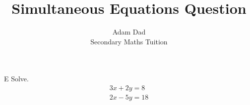 \documentclass[12pt]{article}
\begin{document}
 
 
\title{Simultaneous Equations Question}%
\author{Adam Dad\\ %
Secondary Maths Tuition} %
 
\maketitle
 
\question E Solve. \[\begin{split}3x + 2y = 8 \\ 2x - 5y = 18 \end{split}\]
\end{document}
